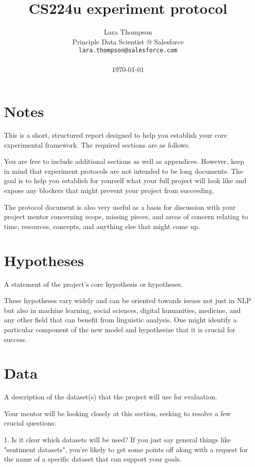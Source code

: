\documentclass[11pt]{article}
\title{CS224u experiment protocol}
\author{Lara Thompson \\
  Principle Data Scientist @ Salesforce \\
  \texttt{lara.thompson@salesforce.com} \\ \\
  \today
}
\begin{document}
\maketitle

\section*{Notes}

This is a short, structured report designed to help you establish your core experimental framework. The required sections are as follows.

You are free to include additional sections as well as appendices. However, keep in mind that experiment protocols are not intended to be long documents. The goal is to help you establish for yourself what your full project will look like and expose any blockers that might prevent your project from succeeding. 

The protocol document is also very useful as a basis for discussion with your project mentor concerning scope, missing pieces, and areas of concern relating to time, resources, concepts, and anything else that might come up.

\section{Hypotheses} 

A statement of the project's core hypothesis or hypotheses.

These hypotheses vary widely and can be oriented towards issues not just in NLP but also in machine learning, social sciences, digital humanities, medicine, and any other field that can benefit from linguistic analysis. One might identify a particular component of the new model and hypothesize that it is crucial for success.

\section{Data}

A description of the dataset(s) that the project will use for evaluation.

Your mentor will be looking closely at this section, seeking to resolve a few crucial questions:

1. Is it clear which datasets will be used? If you just say general things like "sentiment datasets", you're likely to get some points off along with a request for the name of a specific dataset that can support your goals.
\end{document}
